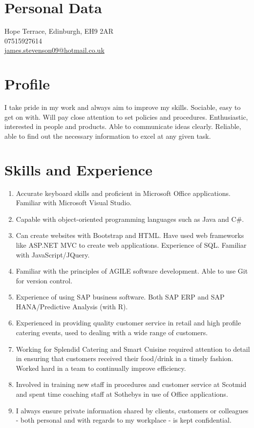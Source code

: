 \documentclass[12pt, a4paper]{article}
\begin{document}
\par{\bigskip\par}

\section{Personal Data}

\large{} Hope Terrace, Edinburgh, EH9 2AR \\
07515927614\\
\href{mailto:james.stevenson09@hotmail.co.uk}{james.stevenson09@hotmail.co.uk}


\section{Profile}

\large{I take pride in my work and always aim to improve my skills.  
Sociable, easy to get on with.
Will pay close attention to set policies and procedures. 
Enthusiastic, interested in people and products. 
Able to communicate ideas clearly. 
Reliable, able to find out the necessary information to excel at any given task.}

\section{Skills and Experience}


\begin{enumerate}
	\item Accurate keyboard skills and proficient in Microsoft Office applications. Familiar with Microsoft Visual Studio.
	\item Capable with object-oriented programming languages such as Java and C\#. 
	\item Can create websites with Bootstrap and HTML. Have used web frameworks like ASP.NET MVC to create web applications. Experience of SQL. Familiar with JavaScript/JQuery.
	\item Familiar with the principles of AGILE software development. Able to use Git for version control.
	\item Experience of using SAP business software. Both SAP ERP and SAP HANA/Predictive Analysis (with R).
	\item Experienced in providing quality customer service in retail and high profile catering events, used to dealing with a wide range of customers.
	\item Working for Splendid Catering and Smart Cuisine required attention to detail in ensuring that customers received their food/drink in a timely fashion. Worked hard in a team to continually improve efficiency.
	\item Involved in training new staff in procedures and customer service at Scotmid and spent time coaching staff at Sothebys in use of Office applications.
	\item I always ensure private information shared by clients, customers or colleagues - both personal and with regards to my workplace - is kept confidential.
\end{enumerate}
\end{document}
